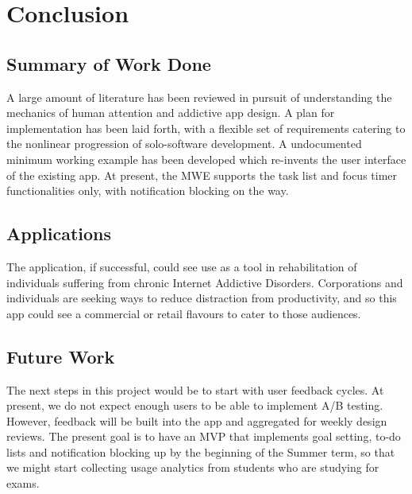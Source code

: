 \chapter{Conclusion}

\label{ch:conclusions}

\section{Summary of Work Done}
A large amount of literature has been reviewed in pursuit of understanding the mechanics of human attention and addictive app design. A plan for implementation has been laid forth, with a flexible set of requirements catering to the nonlinear progression of solo-software development. A undocumented minimum working example has been developed which re-invents the user interface of the existing app. At present, the MWE supports the task list and focus timer functionalities only, with notification blocking on the way.

\section{Applications}
The application, if successful, could see use as a tool in rehabilitation of individuals suffering from chronic Internet Addictive Disorders. Corporations and individuals are seeking ways to reduce distraction from productivity, and so this app could see a commercial or retail flavours to cater to those audiences.

\section{Future Work}
The next steps in this project would be to start with user feedback cycles. At present, we do not expect enough users to be able to implement A/B testing. However, feedback will be built into the app and aggregated for weekly design reviews. The present goal is to have an MVP that implements goal setting, to-do lists and notification blocking up by the beginning of the Summer term, so that we might start collecting usage analytics from students who are studying for exams.